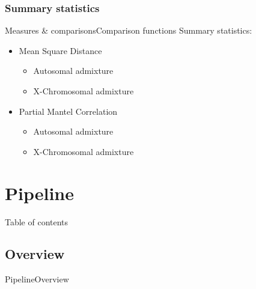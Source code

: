 \documentclass[10pt, aspectratio=43]{beamer}
\begin{document}
\subsubsection{Summary statistics}
\begin{frame}{Measures \& comparisons}{Comparison functions}
Summary statistics:
\begin{itemize}
  \item Mean Square Distance
  \begin{itemize}
    \item Autosomal admixture
    \item X-Chromosomal admixture
  \end{itemize}
  \item Partial Mantel Correlation
  \begin{itemize}
    \item Autosomal admixture
    \item X-Chromosomal admixture
  \end{itemize}
\end{itemize}
\end{frame}


\section{Pipeline}
\begin{frame}{}{Table of contents}
\tableofcontents[currentsection, subsectionstyle=show/show/hide]
\end{frame}

\subsection{Overview}
\begin{frame}{Pipeline}{Overview}
\begin{center}
\end{center}
\end{frame}
\end{document}

